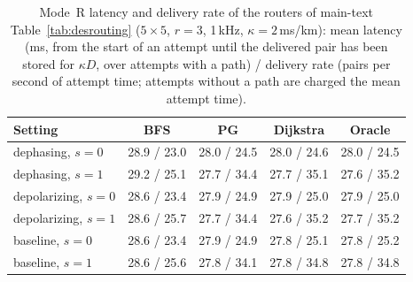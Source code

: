 \begin{table}[!t]
\centering
\caption{Mode~R latency and delivery rate of the routers of main-text Table~\ref{tab:desrouting} ($5\times5$, $r=3$, 1\,kHz, $\kappa=2$\,ms/km): mean latency (ms, from the start of an attempt until the delivered pair has been stored for $\kappa D$, over attempts with a path) / delivery rate (pairs per second of attempt time; attempts without a path are charged the mean attempt time).}
\label{tab:deslatency}
\scriptsize
\setlength{\tabcolsep}{2.5pt}
\begin{tabular}{@{}lcccc@{}}
\toprule
Setting & BFS & PG & Dijkstra & Oracle\\
\midrule
dephasing, $s=0$ & 28.9 / 23.0 & 28.0 / 24.5 & 28.0 / 24.6 & 28.0 / 24.5\\
dephasing, $s=1$ & 29.2 / 25.1 & 27.7 / 34.4 & 27.7 / 35.1 & 27.6 / 35.2\\
depolarizing, $s=0$ & 28.6 / 23.4 & 27.9 / 24.9 & 27.9 / 25.0 & 27.9 / 25.0\\
depolarizing, $s=1$ & 28.6 / 25.7 & 27.7 / 34.4 & 27.6 / 35.2 & 27.7 / 35.2\\
baseline, $s=0$ & 28.6 / 23.4 & 27.9 / 24.9 & 27.8 / 25.1 & 27.8 / 25.2\\
baseline, $s=1$ & 28.6 / 25.6 & 27.8 / 34.1 & 27.8 / 34.8 & 27.8 / 34.8\\
\bottomrule
\end{tabular}
\end{table}
